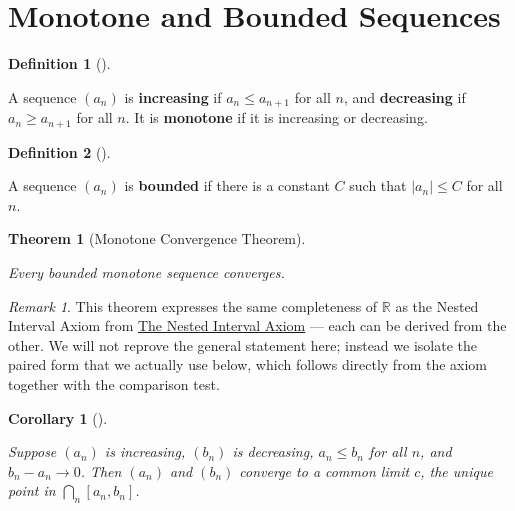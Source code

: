 \documentclass[
  letterpaper,
  DIV=11,
  numbers=noendperiod]{scrreprt}
\theoremstyle{plain}
\theoremstyle{plain}
\theoremstyle{definition}
\newtheorem{definition}{Definition}[chapter]
\theoremstyle{definition}
\theoremstyle{definition}
\theoremstyle{plain}
\newtheorem{theorem}{Theorem}[chapter]
\theoremstyle{plain}
\newtheorem{corollary}{Corollary}[chapter]
\theoremstyle{remark}
\newtheorem{refremark}{Remark}[chapter]
\begin{document}
\section{Monotone and Bounded
Sequences}\label{monotone-and-bounded-sequences}

\begin{definition}[]\protect\hypertarget{def-monotone}{}\label{def-monotone}

\hfill\break
A sequence \((a_n)\) is \textbf{increasing} if \(a_n \le a_{n+1}\) for
all \(n\), and \textbf{decreasing} if \(a_n \ge a_{n+1}\) for all \(n\).
It is \textbf{monotone} if it is increasing or decreasing.

\end{definition}

\begin{definition}[]\protect\hypertarget{def-bounded}{}\label{def-bounded}

\hfill\break
A sequence \((a_n)\) is \textbf{bounded} if there is a constant \(C\)
such that \(\lvert a_n \rvert\le C\) for all \(n\).

\end{definition}

\begin{theorem}[Monotone Convergence
Theorem]\protect\hypertarget{thm-monotone-convergence}{}\label{thm-monotone-convergence}

Every bounded monotone sequence converges.

\end{theorem}

\begin{refremark}
This theorem expresses the same completeness of \(\mathbb{R}\) as the
Nested Interval Axiom from \hyperref[the-nested-interval-axiom]{The
Nested Interval Axiom} --- each can be derived from the other. We will
not reprove the general statement here; instead we isolate the paired
form that we actually use below, which follows directly from the axiom
together with the comparison test.

\label{rem-monotone-nip}

\end{refremark}

\begin{corollary}[]\protect\hypertarget{cor-monotone-squeeze}{}\label{cor-monotone-squeeze}

Suppose \((a_n)\) is increasing, \((b_n)\) is decreasing, \(a_n\le b_n\)
for all \(n\), and \(b_n - a_n \to 0\). Then \((a_n)\) and \((b_n)\)
converge to a common limit \(c\), the unique point in
\(\bigcap_n [a_n,b_n]\).

\end{corollary}
\end{document}
